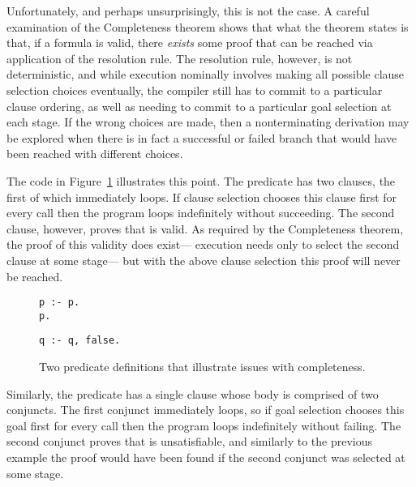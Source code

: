 Unfortunately, and perhaps unsurprisingly, this is not the case.
A careful examination of the Completeness theorem shows that
what the theorem states is that, if a formula is valid,
there \emph{exists} some proof that can be reached
via application of the resolution rule.
The resolution rule, however, is not deterministic,
and while execution nominally involves
making all possible clause selection choices eventually,
the compiler still has to commit to a particular clause ordering,
as well as needing to commit to a particular goal selection at each stage.
If the wrong choices are made,
then a nonterminating derivation may be explored
when there is in fact a successful or failed branch
that would have been reached with different choices.

The code in Figure~\ref{fig:incompleteness} illustrates this point.
The predicate  has two clauses,
the first of which immediately loops.
If clause selection chooses this clause first for every call
then the program loops indefinitely without succeeding.
The second clause, however, proves that  is valid.
As required by the Completeness theorem,
the proof of this validity does exist---%
execution needs only to select the second clause at some stage---%
but with the above clause selection this proof will never be reached.

\begin{figure}
\begin{center}
\begin{minipage}[t]{9em}
\begin{verbatim}
p :- p.
p.
\end{verbatim}
\end{minipage}
\begin{minipage}[t]{9em}
\begin{verbatim}
q :- q, false.
\end{verbatim}
\end{minipage}
\end{center}
\caption{
Two predicate definitions that illustrate issues with completeness.
\label{fig:incompleteness}
}
\end{figure}

Similarly,
the predicate  has a single clause
whose body is comprised of two conjuncts.
The first conjunct immediately loops,
so if goal selection chooses this goal first for every call
then the program loops indefinitely without failing.
The second conjunct proves that  is unsatisfiable,
and similarly to the previous example the proof would have been found
if the second conjunct was selected at some stage.


